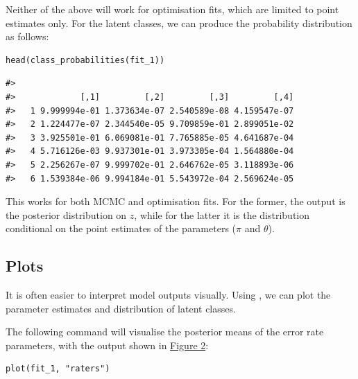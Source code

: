 Neither of the above will work for optimisation fits, which are limited to
point estimates only. For the latent classes, we can produce the probability
distribution as follows:

\begin{verbatim}
head(class_probabilities(fit_1))
\end{verbatim}

\begin{verbatim}
#>    
#>             [,1]         [,2]         [,3]         [,4]
#>   1 9.999994e-01 1.373634e-07 2.540589e-08 4.159547e-07
#>   2 1.224477e-07 2.344540e-05 9.709859e-01 2.899051e-02
#>   3 3.925501e-01 6.069081e-01 7.765885e-05 4.641687e-04
#>   4 5.716126e-03 9.937301e-01 3.973305e-04 1.564880e-04
#>   5 2.256267e-07 9.999702e-01 2.646762e-05 3.118893e-06
#>   6 1.539384e-06 9.994184e-01 5.543972e-04 2.569624e-05
\end{verbatim}

This works for both MCMC and optimisation fits. For the former, the output is
the posterior distribution on \(z\), while for the latter it is the distribution
conditional on the point estimates of the parameters (\(\pi\) and \(\theta\)).

\hypertarget{plots}{%
\subsection{Plots}\label{plots}}

It is often easier to interpret model outputs visually.
Using , we can plot the parameter estimates and
distribution of latent classes.

The following command will visualise the posterior means of the error rate
parameters, with the output shown in \protect\hyperlink{fig:plot-theta}{Figure 2}:

\begin{verbatim}
plot(fit_1, "raters")
\end{verbatim}

